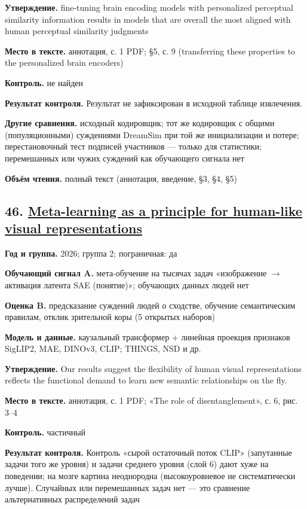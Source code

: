 \textbf{Утверждение.} fine-tuning brain encoding models with personalized perceptual similarity information results in models that are overall the most aligned with human perceptual similarity judgments

\textbf{Место в тексте.} аннотация, с. 1 PDF; §5, с. 9 (transferring these properties to the personalized brain encoders)

\textbf{Контроль.} не найден

\textbf{Результат контроля.} Результат не зафиксирован в исходной таблице извлечения.

\textbf{Другие сравнения.} исходный кодировщик; тот же кодировщик с общими (популяционными) суждениями DreamSim при той же инициализации и потере; перестановочный тест подписей участников — только для статистики; перемешанных или чужих суждений как обучающего сигнала нет

\textbf{Объём чтения.} полный текст (аннотация, введение, §3, §4, §5)


\subsection*{46. \href{https://doi.org/10.48550/arxiv.2606.28399}{Meta-learning as a principle for human-like visual representations}}

\textbf{Год и группа.} 2026; группа 2; пограничная: да

\textbf{Обучающий сигнал A.} мета-обучение на тысячах задач «изображение $\rightarrow$ активация латента SAE (понятие)»; обучающих данных людей нет

\textbf{Оценка B.} предсказание суждений людей о сходстве, обучение семантическим правилам, отклик зрительной коры (5 открытых наборов)

\textbf{Модель и данные.} каузальный трансформер + линейная проекция признаков SigLIP2, MAE, DINOv3, CLIP; THINGS, NSD и др.

\textbf{Утверждение.} Our results suggest the flexibility of human visual representations reflects the functional demand to learn new semantic relationships on the fly.

\textbf{Место в тексте.} аннотация, с. 1 PDF; «The role of disentanglement», с. 6, рис. 3–4

\textbf{Контроль.} частичный

\textbf{Результат контроля.} Контроль «сырой остаточный поток CLIP» (запутанные задачи того же уровня) и задачи среднего уровня (слой 6) дают хуже на поведении; на мозге картина неоднородна (высокоуровневое не систематически лучше). Случайных или перемешанных задач нет — это сравнение альтернативных распределений задач

